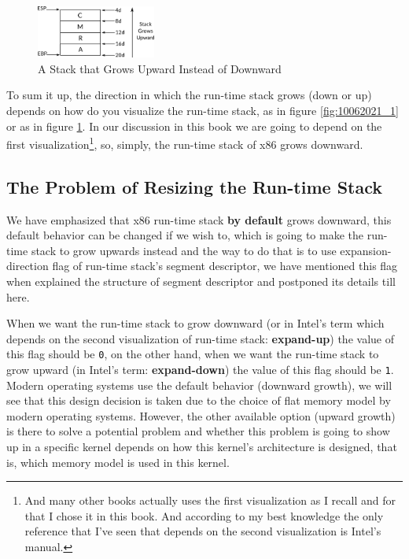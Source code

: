 \begin{figure}
\centering
\includegraphics[width=0.35000\textwidth]{Figures/x86-ch/Fig10062021_2.png}
\caption{A Stack that Grows Upward Instead of
Downward}\label{fig:10062021_2}
\end{figure}

To sum it up, the direction in which the run-time stack grows (down or
up) depends on how do you visualize the run-time stack, as in figure
\ref{fig:10062021_1} or as in figure \ref{fig:10062021_2}. In our
discussion in this book we are going to depend on the first
visualization\footnote{And many other books actually uses the first
  visualization as I recall and for that I chose it in this book. And
  according to my best knowledge the only reference that I've seen that
  depends on the second visualization is Intel's manual.}, so, simply,
the run-time stack of x86 grows downward.

\subsection{The Problem of Resizing the Run-time
Stack}\label{the-problem-of-resizing-the-run-time-stack}

We have emphasized that x86 run-time stack \textbf{by default} grows
downward, this default behavior can be changed if we wish to, which is
going to make the run-time stack to grow upwards instead and the way to
do that is to use expansion-direction flag of run-time stack's segment
descriptor, we have mentioned this flag when explained the structure of
segment descriptor and postponed its details till here.

When we want the run-time stack to grow downward (or in Intel's term
which depends on the second visualization of run-time stack:
\textbf{expand-up}) the value of this flag should be \lstinline!0!, on
the other hand, when we want the run-time stack to grow upward (in
Intel's term: \textbf{expand-down}) the value of this flag should be
\lstinline!1!. Modern operating systems use the default behavior
(downward growth), we will see that this design decision is taken due to
the choice of flat memory model by modern operating systems. However,
the other available option (upward growth) is there to solve a potential
problem and whether this problem is going to show up in a specific
kernel depends on how this kernel's architecture is designed, that is,
which memory model is used in this kernel.

